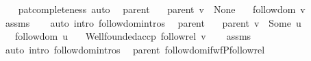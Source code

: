 \begin{isabellebody}
\endisataginvisible
{\isafoldinvisible}%
%
\isadeliminvisible
\isanewline
%
\endisadeliminvisible
%
\isadelimproof
\ \ %
\endisadelimproof
%
\isatagproof
{}\isamarkupfalse%
\ pat{\isacharunderscore}{\kern0pt}completeness\ auto%
\endisatagproof
{\isafoldproof}%
%
\isadelimproof
\isanewline
%
\endisadelimproof
%
\isadeliminvisible
\isanewline
%
\endisadeliminvisible
%
\isataginvisible
{}\isamarkupfalse%
\ {\isacharparenleft}{\kern0pt}\ parent{\isacharparenright}{\kern0pt}\isanewline
\ \ \ {\isachardoublequoteopen}parent\ v\ {\isacharequal}{\kern0pt}\ None{\isachardoublequoteclose}\isanewline
\ \ \ {\isachardoublequoteopen}follow{\isacharunderscore}{\kern0pt}dom\ v{\isachardoublequoteclose}%
\endisataginvisible
{\isafoldinvisible}%
%
\isadeliminvisible
\isanewline
%
\endisadeliminvisible
%
\isadelimproof
\ \ %
\endisadelimproof
%
\isatagproof
{}\isamarkupfalse%
\ assms\isanewline
\ \ \isamarkupfalse%
\ {\isacharparenleft}{\kern0pt}auto\ intro{\isacharcolon}{\kern0pt}\ follow{\isachardot}{\kern0pt}domintros{\isacharparenright}{\kern0pt}%
\endisatagproof
{\isafoldproof}%
%
\isadelimproof
\isanewline
%
\endisadelimproof
%
\isadeliminvisible
\isanewline
%
\endisadeliminvisible
%
\isataginvisible
{}\isamarkupfalse%
\ {\isacharparenleft}{\kern0pt}\ parent{\isacharparenright}{\kern0pt}\isanewline
\ \ \ {\isachardoublequoteopen}parent\ v\ {\isacharequal}{\kern0pt}\ Some\ u{\isachardoublequoteclose}\isanewline
\ \ \ {\isachardoublequoteopen}follow{\isacharunderscore}{\kern0pt}dom\ u{\isachardoublequoteclose}\isanewline
\ \ \ {\isachardoublequoteopen}Wellfounded{\isachardot}{\kern0pt}accp\ follow{\isacharunderscore}{\kern0pt}rel\ v{\isachardoublequoteclose}%
\endisataginvisible
{\isafoldinvisible}%
%
\isadeliminvisible
\isanewline
%
\endisadeliminvisible
%
\isadelimproof
\ \ %
\endisadelimproof
%
\isatagproof
{}\isamarkupfalse%
\ assms\isanewline
\ \ \isamarkupfalse%
\ {\isacharparenleft}{\kern0pt}auto\ intro{\isacharcolon}{\kern0pt}\ follow{\isachardot}{\kern0pt}domintros{\isacharparenright}{\kern0pt}%
\endisatagproof
{\isafoldproof}%
%
\isadelimproof
\isanewline
%
\endisadelimproof
%
\isadeliminvisible
\isanewline
%
\endisadeliminvisible
%
\isataginvisible
{}\isamarkupfalse%
\ {\isacharparenleft}{\kern0pt}\ parent{\isacharparenright}{\kern0pt}\ follow{\isacharunderscore}{\kern0pt}dom{\isacharunderscore}{\kern0pt}if{\isacharunderscore}{\kern0pt}wfP{\isacharunderscore}{\kern0pt}follow{\isacharunderscore}{\kern0pt}rel{\isacharcolon}{\kern0pt}\isanewline

\end{isabellebody}
